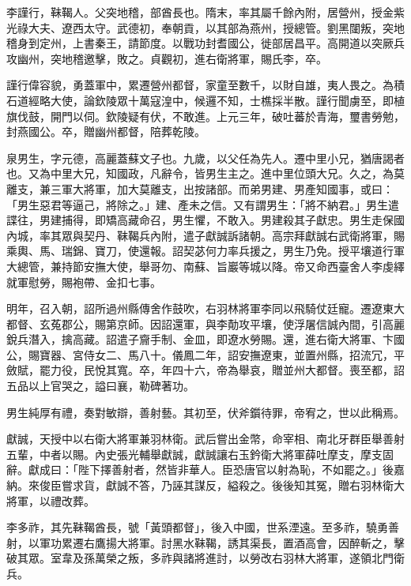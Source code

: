 \begin{pinyinscope}
 李謹行，靺鞨人。父突地稽，部酋長也。隋末，率其屬千餘內附，居營州，授金紫光祿大夫、遼西太守。武德初，奉朝貢，以其部為燕州，授總管。劉黑闥叛，突地稽身到定州，上書秦王，請節度。以戰功封耆國公，徙部居昌平。高開道以突厥兵攻幽州，突地稽邀擊，敗之。貞觀初，進右衛將軍，賜氏李，卒。



 謹行偉容貌，勇蓋軍中，累遷營州都督，家童至數千，以財自雄，夷人畏之。為積石道經略大使，論欽陵眾十萬寇湟中，候邏不知，士樵採半散。謹行聞虜至，即植旗伐鼓，開門以伺。欽陵疑有伏，不敢進。上元三年，破吐蕃於青海，璽書勞勉，封燕國公。卒，贈幽州都督，陪葬乾陵。



 泉男生，字元德，高麗蓋蘇文子也。九歲，以父任為先人。遷中里小兄，猶唐謁者也。又為中里大兄，知國政，凡辭令，皆男生主之。進中里位頭大兄。久之，為莫離支，兼三軍大將軍，加大莫離支，出按諸部。而弟男建、男產知國事，或曰：「男生惡君等逼己，將除之。」建、產未之信。又有謂男生：「將不納君。」男生遣諜往，男建捕得，即矯高藏命召，男生懼，不敢入。男建殺其子獻忠。男生走保國內城，率其眾與契丹、靺鞨兵內附，遣子獻誠訴諸朝。高宗拜獻誠右武衛將軍，賜乘輿、馬、瑞錦、寶刀，使還報。詔契苾何力率兵援之，男生乃免。授平壤道行軍大總管，兼持節安撫大使，舉哥勿、南蘇、旨巖等城以降。帝又命西臺舍人李虔繹就軍慰勞，賜袍帶、金扣七事。



 明年，召入朝，詔所過州縣傳舍作鼓吹，右羽林將軍李同以飛騎仗廷寵。遷遼東大都督、玄菟郡公，賜第京師。因詔還軍，與李勣攻平壤，使浮屠信誠內間，引高麗銳兵潛入，擒高藏。詔遣子齎手制、金皿，即遼水勞賜。還，進右衛大將軍、卞國公，賜寶器、宮侍女二、馬八十。儀鳳二年，詔安撫遼東，並置州縣，招流冗，平斂賦，罷力役，民悅其寬。卒，年四十六，帝為舉哀，贈並州大都督。喪至都，詔五品以上官哭之，謚曰襄，勒碑著功。



 男生純厚有禮，奏對敏辯，善射藝。其初至，伏斧鑕待罪，帝宥之，世以此稱焉。



 獻誠，天授中以右衛大將軍兼羽林衛。武后嘗出金幣，命宰相、南北牙群臣舉善射五輩，中者以賜。內史張光輔舉獻誠，獻誠讓右玉鈐衛大將軍薛吐摩支，摩支固辭。獻成曰：「陛下擇善射者，然皆非華人。臣恐唐官以射為恥，不如罷之。」後嘉納。來俊臣嘗求貨，獻誠不答，乃誣其謀反，縊殺之。後後知其冤，贈右羽林衛大將軍，以禮改葬。



 李多祚，其先靺鞨酋長，號「黃頭都督」，後入中國，世系湮遠。至多祚，驍勇善射，以軍功累遷右鷹揚大將軍。討黑水靺鞨，誘其渠長，置酒高會，因醉斬之，擊破其眾。室韋及孫萬榮之叛，多祚與諸將進討，以勞改右羽林大將軍，遂領北門衛兵。




\end{pinyinscope}
